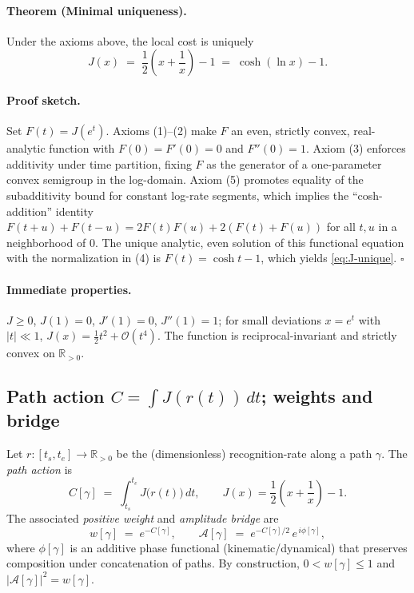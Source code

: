 \documentclass[11pt,letterpaper]{article}
\begin{document}
\paragraph{Theorem (Minimal uniqueness).}
Under the axioms above, the local cost is uniquely
\begin{equation}
J(x)\;=\;\frac12\!\left(x+\frac1x\right)-1 \;=\; \cosh(\ln x)-1.
\label{eq:J-unique}
\end{equation}

\paragraph{Proof sketch.}
Set \(F(t)=J(e^t)\). Axioms (1)--(2) make \(F\) an even, strictly convex, real-analytic function with \(F(0)=F'(0)=0\) and \(F''(0)=1\). Axiom (3) enforces additivity under time partition, fixing \(F\) as the generator of a one-parameter convex semigroup in the log-domain. Axiom (5) promotes equality of the subadditivity bound for constant log-rate segments, which implies the ``cosh-addition'' identity \(F(t+u)+F(t-u)=2F(t)F(u)+2(F(t)+F(u))\) for all \(t,u\) in a neighborhood of \(0\). The unique analytic, even solution of this functional equation with the normalization in (4) is \(F(t)=\cosh t - 1\), which yields \eqref{eq:J-unique}. \hfill\(\square\)

\paragraph{Immediate properties.}
\(J\ge 0\), \(J(1)=0\), \(J'(1)=0\), \(J''(1)=1\); for small deviations \(x=e^t\) with \(|t|\ll 1\), \(J(x)=\tfrac12 t^2+\mathcal O(t^4)\). The function is reciprocal-invariant and strictly convex on \(\mathbb R_{>0}\).

\subsection{Path action \(C=\int J(r(t))\,dt\); weights and bridge}
Let \(r:[t_s,t_e]\to \mathbb R_{>0}\) be the (dimensionless) recognition-rate along a path \(\gamma\). The \emph{path action} is
\begin{equation}
C[\gamma]\;=\;\int_{t_s}^{t_e} J\!\bigl(r(t)\bigr)\,dt,
\qquad
J(x)=\frac12\!\left(x+\frac1x\right)-1.
\label{eq:C-def}
\end{equation}
The associated \emph{positive weight} and \emph{amplitude bridge} are
\begin{equation}
w[\gamma]\;=\;e^{-C[\gamma]},
\qquad
\mathcal A[\gamma]\;=\;e^{-C[\gamma]/2}\,e^{\,i\phi[\gamma]},
\label{eq:bridge}
\end{equation}
where \(\phi[\gamma]\) is an additive phase functional (kinematic/dynamical) that preserves composition under concatenation of paths. By construction, \(0<w[\gamma]\le 1\) and \(|\mathcal A[\gamma]|^2=w[\gamma]\).
\end{document}
